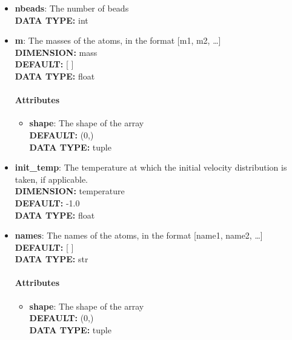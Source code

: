 \begin{itemize}
\item {\bf nbeads}:
 The number of beads
{\\ \bf DATA TYPE: }int
\item {\bf m}:
 The masses of the atoms, in the format [m1, m2, \ldots  ]
{\\ \bf DIMENSION: }mass
{\\ \bf DEFAULT: }[ ]
{\\ \bf DATA TYPE: }float
\paragraph{Attributes}
 \begin{itemize}
\item {\bf shape}:
 The shape of the array
{\\ \bf DEFAULT: }(0,)
{\\ \bf DATA TYPE: }tuple
\end{itemize}
 
\item {\bf init\_temp}:
 The temperature at which the initial velocity distribution is taken, if applicable.
{\\ \bf DIMENSION: }temperature
{\\ \bf DEFAULT: }-1.0
{\\ \bf DATA TYPE: }float
\item {\bf names}:
 The names of the atoms, in the format [name1, name2, \ldots  ]
{\\ \bf DEFAULT: }[ ]
{\\ \bf DATA TYPE: }str
\paragraph{Attributes}
 \begin{itemize}
\item {\bf shape}:
 The shape of the array
{\\ \bf DEFAULT: }(0,)
{\\ \bf DATA TYPE: }tuple
\end{itemize}
 
\end{itemize}
 

